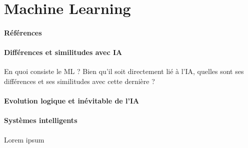 \section{Machine Learning}
\paragraph{Références} \cite{AlphaGo0} \cite{AlphaGo1}

\paragraph{Différences et similitudes avec IA} En quoi consiste le ML ? Bien qu'il soit
directement lié à l'IA, quelles sont ses différences et ses similitudes avec cette dernière ?

\paragraph{Evolution logique et inévitable de l'IA} 

\paragraph{Systèmes intelligents} Lorem ipsum

